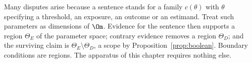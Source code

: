 \begin{remark}
Many disputes arise because a sentence stands for a family $c(\theta)$ with $\theta$ specifying a threshold, an exposure, an outcome or an estimand. Treat such parameters as dimensions of $\Om$. Evidence for the sentence then supports a region $\Theta_E$ of the parameter space; contrary evidence removes a region $\Theta_D$; and the surviving claim is $\Theta_E\setminus\Theta_D$, a scope by Proposition~\ref{prop:boolean}. Boundary conditions are regions. The apparatus of this chapter requires nothing else.
\end{remark}
